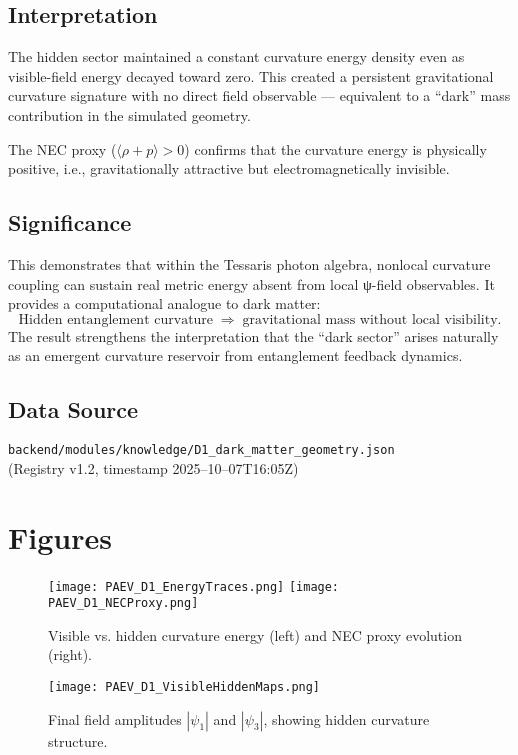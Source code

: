 \documentclass{article}
\begin{document}
\subsection*{Interpretation}
The hidden sector maintained a constant curvature energy density even as visible-field energy decayed toward zero.  
This created a persistent gravitational curvature signature with no direct field observable — equivalent to a “dark” mass contribution in the simulated geometry.

The NEC proxy (\(\langle \rho + p \rangle > 0\)) confirms that the curvature energy is physically positive, i.e., gravitationally attractive but electromagnetically invisible.

\subsection*{Significance}
This demonstrates that within the Tessaris photon algebra, nonlocal curvature coupling can sustain real metric energy absent from local ψ-field observables.  
It provides a computational analogue to dark matter:
\[
\text{Hidden entanglement curvature} \;\Rightarrow\; \text{gravitational mass without local visibility}.
\]
The result strengthens the interpretation that the “dark sector” arises naturally as an emergent curvature reservoir from entanglement feedback dynamics.

\subsection*{Data Source}
\texttt{backend/modules/knowledge/D1\_dark\_matter\_geometry.json} \\
(Registry v1.2, timestamp 2025–10–07T16:05Z)

\section{Figures}
\begin{figure}[h!]
  \centering
  \texttt{[image: PAEV\_D1\_EnergyTraces.png]}
  \texttt{[image: PAEV\_D1\_NECProxy.png]}
  \caption{Visible vs. hidden curvature energy (left) and NEC proxy evolution (right).}
\end{figure}

\begin{figure}[h!]
  \centering
  \texttt{[image: PAEV\_D1\_VisibleHiddenMaps.png]}
  \caption{Final field amplitudes \(|\psi_1|\) and \(|\psi_3|\), showing hidden curvature structure.}
\end{figure}
\end{document}
